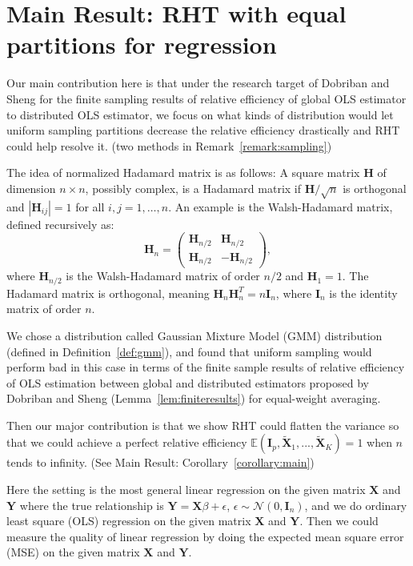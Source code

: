 \documentclass[11pt]{article}
\numberwithin{equation}{section}
\theoremstyle{plain}
\theoremstyle{definition}
\theoremstyle{remark}
\begin{document}
\section{Main Result: RHT with equal partitions for regression}
Our main contribution here is that under the research target of Dobriban and Sheng \cite{dobriban2022distributedlinearregressionaveraging} for the finite sampling results of relative efficiency of global OLS estimator to distributed OLS estimator, we focus on
what kinds of distribution would let uniform sampling partitions decrease the relative efficiency drastically and RHT could help resolve it. (two methods in Remark~\ref{remark:sampling})

The idea of normalized Hadamard matrix is as follows:
A square matrix \( \mathbf{H} \) of dimension \( n \times n \), possibly complex, is a Hadamard matrix if \( \mathbf{H} / \sqrt{n} \) is orthogonal and \( |\mathbf{H}_{ij}| = 1 \) for all \( i, j = 1, \ldots, n \). An example is the Walsh-Hadamard matrix, defined recursively as:
\[
\mathbf{H}_n = \begin{pmatrix} \mathbf{H}_{n/2} & \mathbf{H}_{n/2} \\ \mathbf{H}_{n/2} & -\mathbf{H}_{n/2} \end{pmatrix},
\]
where \( \mathbf{H}_{n/2} \) is the Walsh-Hadamard matrix of order \( n/2 \) and \( \mathbf{H}_1 = 1 \). The Hadamard matrix is orthogonal, meaning \( \mathbf{H}_n \mathbf{H}_n^T = n\mathbf{I}_n \), where \( \mathbf{I}_n \) is the identity matrix of order \( n \).

We chose a distribution called Gaussian Mixture Model (GMM) distribution (defined in Definition~\ref{def:gmm}), and found that uniform sampling would perform bad in this case in terms of the finite sample results of relative efficiency of OLS estimation between global and distributed estimators proposed by Dobriban and Sheng \cite{dobriban2022distributedlinearregressionaveraging} (Lemma~\ref{lem:finiteresults}) for equal-weight averaging.

Then our major contribution is that we show RHT could flatten the variance so that we could achieve a perfect relative efficiency $\mathbb{E}(\mathbf{I}_p,\tilde{\mathbf{X}}_1,...,\tilde{\mathbf{X}}_K) = 1$ when $n$ tends to infinity. (See Main Result: Corollary~\ref{corollary:main})

Here the setting is the most general linear regression on the given matrix $\mathbf{X}$ and $\mathbf{Y}$ where the true relationship is $\mathbf{Y} = \mathbf{X}\beta + \epsilon$, $\epsilon\sim\mathcal N(0,\mathbf{I}_n)$, and we do ordinary least square (OLS) regression on the given matrix $\mathbf{X}$ and $\mathbf{Y}$.
Then we could measure the quality of linear regression by doing the expected mean square error (MSE) on the given matrix $\mathbf{X}$ and $\mathbf{Y}$.
\end{document}
